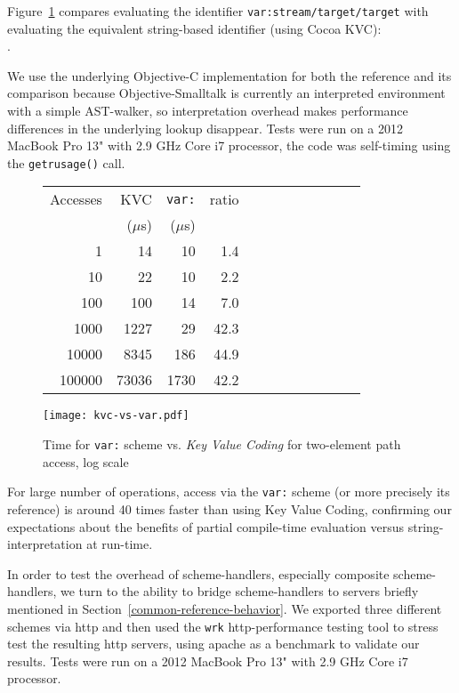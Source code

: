 \documentclass[preprint]{sigplanconf}
\begin{document}
\sloppy
Figure~\ref{var-speed} compares evaluating the identifier {\tt var:stream/target/target} with evaluating the  
equivalent string-based identifier (using Cocoa KVC): \\  { . }
\fussy

We use the underlying Objective-C implementation for both the reference and its 
comparison because Objective-Smalltalk is currently an interpreted environment with
a simple AST-walker, so interpretation overhead makes performance differences in
the underlying lookup disappear.  Tests were run on a 2012 MacBook Pro 13" with 2.9 GHz Core i7 processor, the
code was self-timing using the {\tt getrusage()} call.  

\begin{figure}
\begin{minipage}[c]{0.38\textwidth}
\begin{tabular}{|r|r|r|r|r|r|r|r|r|r|r|r|} \hline
Accesses  & KVC& {\tt var:}   & ratio	\\ 
 & ($\mu$s) & ($\mu$s) & \\ \hline
1 & 14 & 10 & 1.4   \\ %
10 & 22 & 10 &   2.2 \\   %
100 & 100 & 14 &  7.0\\   %
1000 & 1227 & 29 &  42.3  \\  %
10000 & 8345 & 186 &   44.9 \\   %
100000 & 73036 & 1730 &    42.2 \\ \hline
\end{tabular}
\end{minipage}
\begin{minipage}[c]{0.39\textwidth}
\texttt{[image: kvc-vs-var.pdf]}
\end{minipage}
\vspace{-2.0em}
\caption{Time for  {\tt var:} scheme vs. \emph{Key Value Coding} for two-element path access, log scale}
\label{var-speed}
\end{figure}

For large number of operations, access via the {\tt var:} scheme (or more precisely its reference) is
around 40 times faster than using Key Value Coding, confirming our expectations about the benefits
of partial compile-time evaluation versus string-interpretation at run-time.  

In order to test the overhead of scheme-handlers, especially composite scheme-handlers, we turn
to the ability to bridge scheme-handlers to servers briefly mentioned in Section~\ref{common-reference-behavior}.
We exported three different schemes via http and then used the {\tt wrk} http-performance testing tool to stress
test the resulting http servers, using apache as a benchmark to validate our results.  Tests were run on a 2012 MacBook Pro 13" with 2.9 GHz Core i7 processor.
\end{document}
